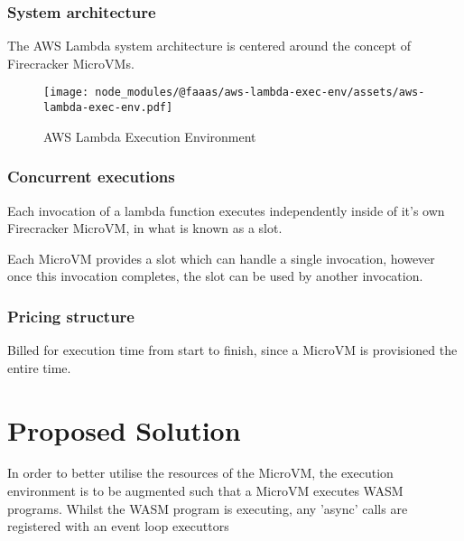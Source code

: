 \documentclass[a4paper,twocolumn]{article}
\begin{document}
\subsubsection{System architecture}

The AWS Lambda system architecture is centered around the concept of Firecracker MicroVMs\cite{firecracker-microvm}.

\begin{figure*}[t]
    \texttt{[image: node\_modules/@faaas/aws-lambda-exec-env/assets/aws-lambda-exec-env.pdf]}
    \caption{AWS Lambda Execution Environment}
    \label{fig:aws-lambda-exec-env}
\end{figure*}

\subsubsection{Concurrent executions}

Each invocation of a lambda function executes independently inside of it's own Firecracker MicroVM, in what is known as a slot.

Each MicroVM provides a slot which can handle a single invocation, however once this invocation completes, the slot can be used by another invocation.

\subsubsection{Pricing structure}

Billed for execution time from start to finish, since a MicroVM is provisioned the entire time.

\section{Proposed Solution}

In order to better utilise the resources of the MicroVM, the execution environment is to be augmented such that a MicroVM executes WASM programs. Whilst the WASM program is executing, any 'async' calls are registered with an event loop executtors

\printbibliography
\end{document}
